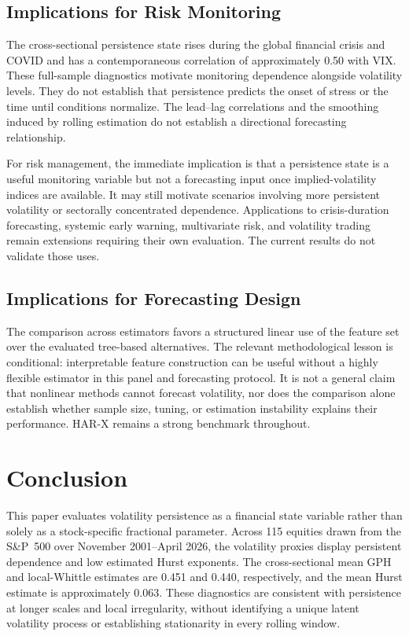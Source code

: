 \documentclass[jrfm,article,submit,moreauthors,pdftex]{Definitions/mdpi}
\begin{document}
\subsection{Implications for Risk Monitoring}

The cross-sectional persistence state rises during the global financial
crisis and COVID and has a contemporaneous correlation of approximately
0.50 with VIX. These full-sample diagnostics motivate monitoring dependence
alongside volatility levels. They do not establish that persistence predicts
the onset of stress or the time until conditions normalize. The lead--lag
correlations and the smoothing induced by rolling estimation do not
establish a directional forecasting relationship.

For risk management, the immediate implication is that a persistence state
is a useful monitoring variable but not a forecasting input once
implied-volatility indices are available. It may still motivate scenarios
involving more persistent volatility or sectorally concentrated
dependence. Applications to crisis-duration
forecasting, systemic early warning, multivariate risk, and volatility
trading remain extensions requiring their own evaluation. The current
results do not validate those uses.

\subsection{Implications for Forecasting Design}

The comparison across estimators favors a structured linear use of the
feature set over the evaluated tree-based alternatives. The relevant
methodological lesson is conditional: interpretable feature construction
can be useful without a highly flexible estimator in this panel and
forecasting protocol. It is not a general claim that nonlinear methods
cannot forecast volatility, nor does the comparison alone establish
whether sample size, tuning, or estimation instability explains their
performance. HAR-X remains a strong benchmark throughout.

\section{Conclusion}
\label{sec:conclusion}

This paper evaluates volatility persistence as a financial state variable
rather than solely as a stock-specific fractional parameter. Across 115
equities drawn from the S\&P~500 over November 2001--April 2026, the
volatility proxies display persistent dependence and low estimated Hurst
exponents. The cross-sectional mean GPH and local-Whittle estimates are
0.451 and 0.440, respectively, and the mean Hurst estimate is approximately
0.063. These diagnostics are consistent with persistence at longer scales
and local irregularity, without identifying a unique latent volatility
process or establishing stationarity in every rolling window.
\end{document}
